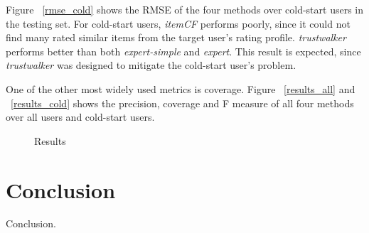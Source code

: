 \documentclass[12pt]{article}
\begin{document}
Figure ~\ref{rmse_cold} shows the RMSE of the four methods over cold-start users in the testing set. For cold-start users, \emph{itemCF} performs poorly, since it could not find many rated similar items from the target user's rating profile. \emph{trustwalker} performs better than both \emph{expert-simple} and \emph{expert}. This result is expected, since \emph{trustwalker} was designed to mitigate the cold-start user's problem. 

One of the other most widely used metrics is coverage. Figure ~\ref{results_all} and ~\ref{results_cold} shows the precision, coverage and F measure of all four methods over all users and cold-start users. 

\begin{figure}[h]
	\centering
	
	\caption{Results}

\end{figure}



\section{Conclusion}
Conclusion.




\end{document}

